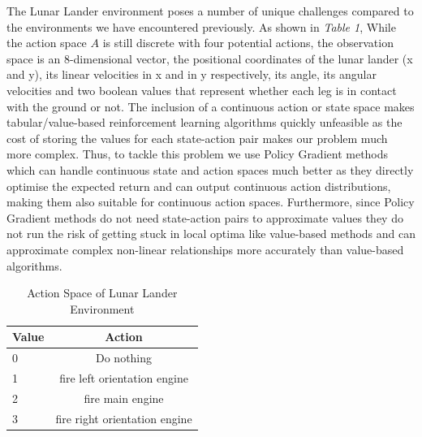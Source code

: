 \documentclass{article}
\begin{document}

The Lunar Lander environment poses a number of unique challenges compared to the environments we have encountered previously. As shown in \emph{Table 1}, While the action space $A$ is still discrete with four potential actions, the observation space is an 8-dimensional vector, the positional coordinates of the lunar lander (x and y), its linear velocities in x and in y respectively, its angle, its angular velocities and two boolean values that represent whether each leg is in contact with the ground or not. The inclusion of a continuous action or state space makes tabular/value-based reinforcement learning algorithms quickly unfeasible as the cost of storing the values for each state-action pair makes our problem much more complex. \newline
Thus, to tackle this problem we use Policy Gradient methods which can handle continuous state and action spaces much better as they directly optimise the expected return and can output continuous action distributions, making them also suitable for continuous action spaces. Furthermore, since Policy Gradient methods do not need state-action pairs to approximate values they do not run the risk of getting stuck in local optima like value-based methods and can approximate complex non-linear relationships more accurately than value-based algorithms.

\begin{table}[htbp]
\centering
\begin{tabular}{|l|c|}
\hline
\textbf{Value} & \textbf{Action} \\
\hline
0  & Do nothing \\
\hline
1 & fire left orientation engine \\
\hline
2  & fire main engine \\
\hline
3 & fire right orientation engine  \\
\hline
\end{tabular}
\caption{Action Space of Lunar Lander Environment}
\label{tab:hyper-parameters}
\end{table}
\end{document}

